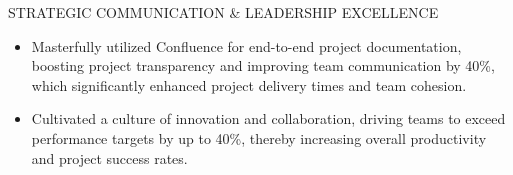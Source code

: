 \documentclass{resume} %
\begin{document}

\begin{rSection}{STRATEGIC COMMUNICATION \& LEADERSHIP EXCELLENCE} 

\begin{itemize}
    \item Masterfully utilized Confluence for end-to-end project documentation, boosting project transparency and improving team communication by 40\%, which significantly enhanced project delivery times and team cohesion.
    \item Cultivated a culture of innovation and collaboration, driving teams to exceed performance targets by up to 40\%, thereby increasing overall productivity and project success rates.
\end{itemize}

\end{rSection}
\end{document}
